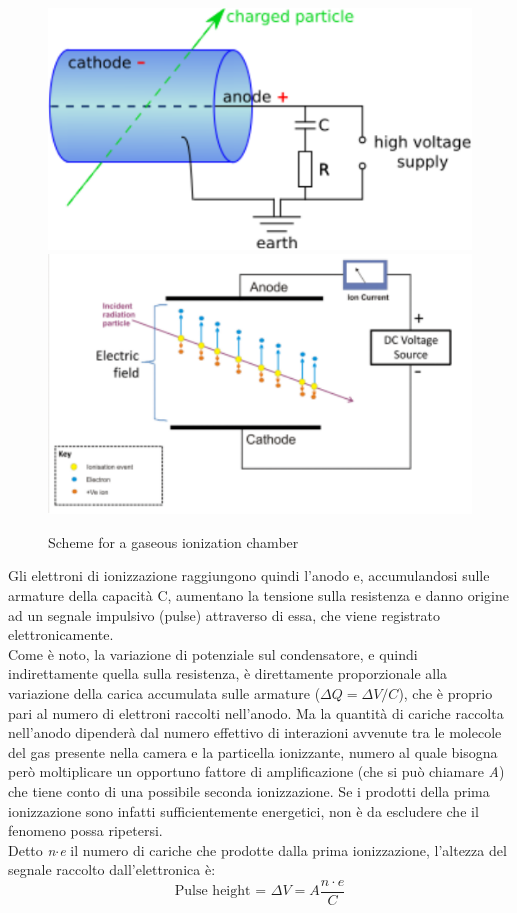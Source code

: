 \documentclass[a4paper,11pt]{book}
\begin{document}
\begin{figure}[hbtp]
\includegraphics{pictures/gas_ion_det.pdf}
\includegraphics{pictures/gas_ion_det_2.pdf}
\caption{Scheme for a gaseous ionization chamber}
\label{fig:gas_ion_ch_scheme}
\end{figure}

Gli elettroni di ionizzazione raggiungono quindi l'anodo e, accumulandosi sulle armature della capacità C, aumentano la tensione sulla resistenza e danno origine ad un segnale impulsivo (pulse) attraverso di essa, che viene registrato elettronicamente.\\

Come è noto, la variazione di potenziale sul condensatore, e quindi indirettamente quella sulla resistenza, è direttamente proporzionale alla variazione della carica accumulata sulle armature ($\Delta Q = \Delta V/C$), che è proprio pari al numero di elettroni raccolti nell'anodo. Ma la quantità di cariche raccolta nell'anodo dipenderà dal numero effettivo di interazioni avvenute tra le molecole del gas presente nella camera e la particella ionizzante, numero al quale bisogna però moltiplicare un opportuno fattore di amplificazione (che si può chiamare \textit{A}) che tiene conto di una possibile seconda ionizzazione. Se i prodotti della prima ionizzazione sono infatti sufficientemente energetici, non è da escludere che il fenomeno possa ripetersi.\\
Detto \textit{n$\cdot$e} il numero di cariche che prodotte dalla prima ionizzazione, l'altezza del segnale raccolto dall'elettronica è:\\
\[ \text{Pulse height = } \Delta V = A\frac{n\cdot e}{C} \]
\end{document}
